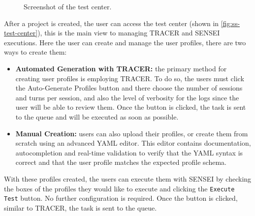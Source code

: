 \begin{figure}[!htb]
  \centering
  \caption{Screenshot of the test center.}
  \label{fig:ss-test-center}
\end{figure}

After a project is created,
the user can access the test center
(shown in \autoref{fig:ss-test-center}),
this is the main view to managing \ac{TRACER} and SENSEI executions.
Here the user can create and manage the user profiles,
there are two ways to create them:
\begin{itemize}
  \item \textbf{Automated Generation with \ac{TRACER}:}
    the primary method for creating user profiles is employing \ac{TRACER}.
    To do so, the users must click the Auto-Generate Profiles button
    and there choose the number of sessions and turns per session,
    and also the level of verbosity for the logs
    since the user will be able to review them.
    Once the button is clicked, the task is sent to the queue
    and will be executed as soon as possible.
  \item \textbf{Manual Creation:}
    users can also upload their profiles,
    or create them from scratch using an advanced YAML editor.
    This editor contains documentation, autocompletion
    and real-time validation to verify that the YAML syntax is correct
    and that the user profile matches the expected profile schema.
\end{itemize}

With these profiles created,
the users can execute them with SENSEI
by checking the boxes of the profiles they would like to execute
and clicking the \texttt{Execute Test} button.
No further configuration is required.
Once the button is clicked, similar to \ac{TRACER},
the task is sent to the queue.

